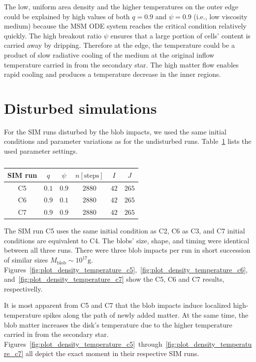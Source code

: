     The low, uniform area density and the higher temperatures on the outer edge could be explained by high values of both $q = 0.9$ and $\psi = 0.9$ (i.e., low viscosity medium) because the MSM ODE system reaches the critical condition relatively quickly. The high breakout ratio $\psi$ ensures that a large portion of cells' content is carried away by dripping. Therefore at the edge, the temperature could be a product of slow radiative cooling of the medium at the original inflow temperature carried in from the secondary star. The high matter flow enables rapid cooling and produces a temperature decrease in the inner regions.

\section{Disturbed simulations}
    For the SIM runs disturbed by the blob impacts, we used the same initial conditions and parameter variations as for the undisturbed runs. Table~\ref{tab:table_simultation_cases_disturbed} lists the used parameter settings.

    \begin{table}[ht]
    \centering
    \begin{tabular*}{\columnwidth}{@{\extracolsep{\fill}}cccccc}
        SIM run & $q$ & $\psi$ & $n [\mathrm{steps}]$ & $I$ & $J$ \\ 
    \hline\hline
        C5 & $0.1$ & $0.9$ & $2880$ & $42$ & $265$ \\
        C6 & $0.9$ & $0.1$ & $2880$ & $42$ & $265$ \\
        C7 & $0.9$ & $0.9$ & $2880$ & $42$ & $265$ \\
    \hline
    \end{tabular*}
    \caption{}
    \label{tab:table_simultation_cases_disturbed}
    \end{table}

    The SIM run C5 uses the same initial condition as C2, C6 as C3, and C7 initial conditions are equivalent to C4. The blobs' size, shape, and timing were identical between all three runs. There were three blob impacts per run in short succession of similar sizes $M_{\mathrm{blob}}\sim 10^{17} \si{\gram}$. Figures~\ref{fig:plot_density_temperature_c5},~\ref{fig:plot_density_temperature_c6},~and~\ref{fig:plot_density_temperature_c7} show the C5, C6 and C7 results, respectivelly.

    It is most apparent from C5 and C7 that the blob impacts induce localized high-temperature spikes along the path of newly added matter. At the same time, the blob matter increases the disk's temperature due to the higher temperature carried in from the secondary star. Figures~\ref{fig:plot_density_temperature_c5}~through~\ref{fig:plot_density_temperature_c7} all depict the exact moment in their respective SIM runs.


